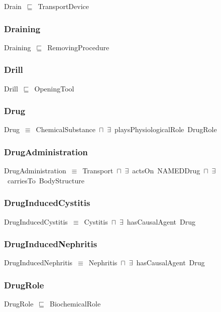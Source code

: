 \documentclass{article}
\begin{document}
Drain~\ensuremath{\sqsubseteq}~TransportDevice~

\subsubsection*{Draining}

Draining~\ensuremath{\sqsubseteq}~RemovingProcedure~

\subsubsection*{Drill}

Drill~\ensuremath{\sqsubseteq}~OpeningTool~

\subsubsection*{Drug}

Drug~\ensuremath{\equiv}~ChemicalSubstance~\ensuremath{\sqcap}~\ensuremath{\exists}~playsPhysiologicalRole~DrugRole

\subsubsection*{DrugAdministration}

DrugAdministration~\ensuremath{\equiv}~Transport~\ensuremath{\sqcap}~\ensuremath{\exists}~actsOn~NAMEDDrug~\ensuremath{\sqcap}~\ensuremath{\exists}~carriesTo~BodyStructure

\subsubsection*{DrugInducedCystitis}

DrugInducedCystitis~\ensuremath{\equiv}~Cystitis~\ensuremath{\sqcap}~\ensuremath{\exists}~hasCausalAgent~Drug

\subsubsection*{DrugInducedNephritis}

DrugInducedNephritis~\ensuremath{\equiv}~Nephritis~\ensuremath{\sqcap}~\ensuremath{\exists}~hasCausalAgent~Drug

\subsubsection*{DrugRole}

DrugRole~\ensuremath{\sqsubseteq}~BiochemicalRole~
\end{document}

